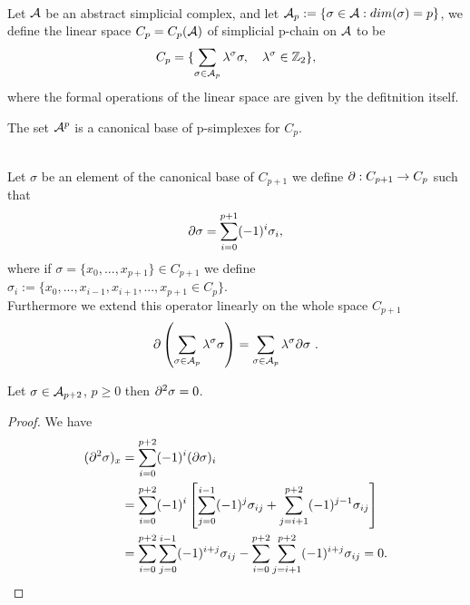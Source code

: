 \documentclass[../1.tex]{subfiles}
\begin{document}
    \begin{defn}
        \\
        Let $\mathcal{A}$ be an abstract simplicial complex, and let $\mathcal{A}_p := \{\sigma \in \mathcal{A} : dim(\sigma) = p\}$, 
        we define the linear space $C_p = C_p(\mathcal{A})$ of simplicial p-chain on $\mathcal{A}$ to be 
        \[ C_p = \{ \sum_{\sigma \in \mathcal{A}_p} \lambda^\sigma \sigma ,\quad \lambda^\sigma \in \mathbb{Z}_2\}, \]
        where the formal operations of the linear space are given by the defitnition itself.
    \end{defn}
    The set $\mathcal{A}^p$ is a canonical base of p-simplexes for $C_p$.\\
    \begin{defn}
        \\
        Let $\sigma$ be an element of the canonical base of $C_{p+1}$ we define $\partial : C_{p+1} \to C_p$ such that
        \[ \partial \sigma = \sum_{i = 0}^{p+1} (-1)^i \sigma_i, \]
        where if $ \sigma = \{x_0, ..., x_{p+1}\} \in C_{p+1}$ we define $\sigma_i := \{x_0, ..., x_{i-1},x_{i+1}, ..., x_{p+1} \in C_p\}$.\\
        Furthermore we extend this operator linearly on the whole space $C_{p+1}$
        \[ \partial \left( \sum_{\sigma \in \mathcal{A}_p} \lambda^\sigma \sigma \right) = \sum_{\sigma \in \mathcal{A}_p} \lambda^\sigma \partial \sigma \ .\]
    \end{defn}
    \begin{lem}
        Let $\sigma \in \mathcal{A}_{p+2}$, $p \geq 0$ then $\partial^2 \sigma = 0$.
    \end{lem}
    \begin{proof}
        We have \\
        \begin{equation*}
            \begin{aligned}
                (\partial^2 \sigma)_x &= \sum_{i = 0}^{p+2} (-1)^i (\partial \sigma)_i \\
                &= \sum_{i = 0}^{p+2} (-1)^i \left[ \sum_{j = 0}^{i-1}(-1)^j \sigma_{ij} + 
                \sum_{j = i+1}^{p+2} (-1)^{j-1} \sigma_{ij} \right]\\
                &= \sum_{i = 0}^{p+2} \sum_{j = 0}^{i-1} (-1)^{i+j} \sigma_{ij} -
                \sum_{i = 0}^{p+2} \sum_{j = i+1}^{p+2} (-1)^{i+j} \sigma_{ij} = 0.
            \end{aligned}
        \end{equation*}
    \end{proof}
\end{document}
